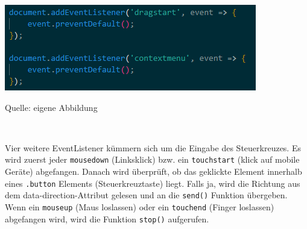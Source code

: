 \documentclass[ngerman,12pt,a4paper]{article}
\begin{document}
	\begin{center}
		\begin{minipage}[t]{0.7\textwidth}
			\includegraphics{Pictures/Steuerung-js1}
			\label{fig:Steuerkreuz-js1}
			\vspace{-10pt}
			\begin{center}
				\par\small Quelle: eigene Abbildung 
			\end{center}
		\end{minipage} \\[0.75cm]
	\end{center}
	Vier weitere EventListener kümmern sich um die Eingabe des Steuerkreuzes. Es wird zuerst jeder \texttt{mousedown} (Linksklick) bzw. ein \texttt{touchstart} (klick auf mobile Geräte) abgefangen. Danach wird überprüft, ob das geklickte Element innerhalb eines \texttt{.button} Elements (Steuerkreuztaste) liegt. Falls ja, wird die Richtung aus dem data-direction-Attribut gelesen und an die \texttt{send()} Funktion übergeben. Wenn ein \texttt{mouseup} (Maus loslassen) oder ein \texttt{touchend} (Finger loslassen) abgefangen wird, wird die Funktion \texttt{stop()} aufgerufen. 
\end{document}
